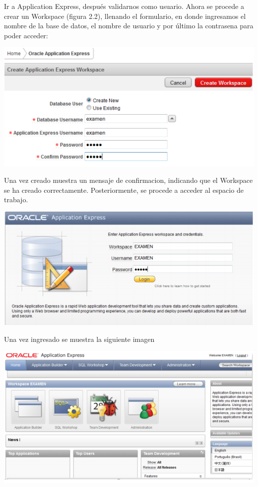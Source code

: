 \documentclass[12pt,letterpaper]{article}
\begin{document}
Ir a Application Express, después validarnos como usuario. Ahora se procede a
crear un Workspace (figura 2.2), llenando el formulario, en donde ingresamos el
nombre de la base de datos, el nombre de usuario y por último la
contrasena para poder acceder:
\begin{center}
\includegraphics[width=15cm]{./IMG/img7}
\end{center}
Una vez creado muestra un mensaje de confirmacion, indicando que el
Workspace se ha creado correctamente. Posteriormente, se procede a acceder al
espacio de trabajo.
\begin{center}
\includegraphics[width=15cm]{./IMG/img8}
\end{center}
Una vez ingresado se muestra la siguiente imagen
\begin{center}
\includegraphics[width=15cm]{./IMG/img9}
\end{center}
\end{document}
